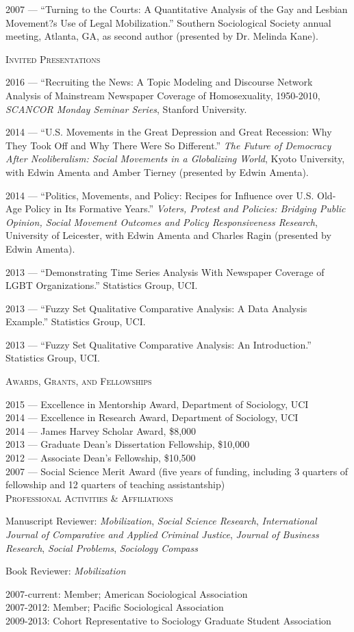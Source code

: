 \documentclass[11pt]{article}
\newcommand{\sectionheader}[1]{
{\Large
\textsc{#1}}
}
\begin{document}
2007	 --- ``Turning to the Courts: A Quantitative Analysis of the Gay and Lesbian Movement?s Use of Legal Mobilization.'' Southern Sociological Society annual meeting, Atlanta, GA, as second author (presented by Dr. Melinda Kane).

\sectionheader{Invited Presentations}

2016 --- ``Recruiting the News: A Topic Modeling and Discourse Network Analysis of Mainstream Newspaper Coverage of Homosexuality, 1950-2010, \textit{SCANCOR Monday Seminar Series}, Stanford University.

2014 --- ``U.S. Movements in the Great Depression and Great Recession: Why They Took Off and Why There Were So Different.'' \textit{The Future of Democracy After Neoliberalism: Social Movements in a Globalizing World}, Kyoto University, with Edwin Amenta and Amber Tierney (presented by Edwin Amenta). 

2014 --- ``Politics, Movements, and Policy: Recipes for Influence over U.S. Old-Age Policy in Its Formative Years.'' \textit{Voters, Protest and Policies: Bridging Public Opinion, Social Movement Outcomes and Policy Responsiveness Research}, University of Leicester, with Edwin Amenta and Charles Ragin (presented by Edwin Amenta).

2013 --- ``Demonstrating Time Series Analysis With Newspaper Coverage of LGBT Organizations.'' Statistics Group, UCI.

2013 --- ``Fuzzy Set Qualitative Comparative Analysis: A Data Analysis Example.'' Statistics Group, UCI.

2013 --- ``Fuzzy Set Qualitative Comparative Analysis: An Introduction.'' Statistics Group, UCI.



\sectionheader{Awards, Grants, and Fellowships}

2015 --- Excellence in Mentorship Award, Department of Sociology, UCI\\
2014 --- Excellence in Research Award, Department of Sociology, UCI\\
2014 --- James Harvey Scholar Award, \$8,000\\
2013 --- Graduate Dean's Dissertation Fellowship, \$10,000\\
2012 --- Associate Dean's Fellowship, \$10,500\\
2007 --- Social Science Merit Award (five years of funding, including 3 quarters of fellowship and 12 quarters of teaching assistantship)\\


\sectionheader{Professional Activities \& Affiliations}

Manuscript Reviewer: \textit{Mobilization}, \textit{Social Science Research}, \textit{International Journal of Comparative and Applied Criminal Justice}, \textit{Journal of Business Research}, \textit{Social Problems}, \textit{Sociology Compass}

Book Reviewer: \textit{Mobilization}

2007-current:	Member; American Sociological Association\\
2007-2012:	Member; Pacific Sociological Association\\
2009-2013:	Cohort Representative to Sociology Graduate Student Association
\end{document}
